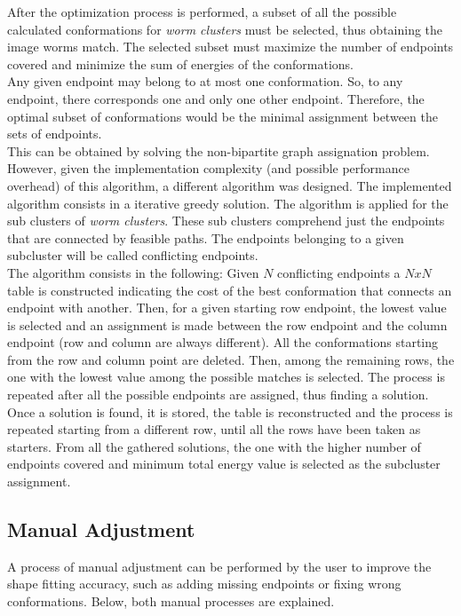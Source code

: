 After the optimization process is performed, a subset of all the possible calculated 
conformations for \emph{worm clusters} must be selected, thus obtaining the image
worms match. The selected subset must maximize the number of endpoints covered and 
minimize the sum of energies of the conformations.\\
Any given endpoint may belong to at most one conformation. So, to any endpoint,
 there corresponds one and only one other endpoint. Therefore, the optimal subset of
conformations would be the minimal assignment between the sets of endpoints.\\
This can be obtained by solving the non-bipartite graph assignation problem. However,
given the implementation complexity (and possible performance overhead) of this algorithm,
a different algorithm  was designed. The implemented algorithm consists in a iterative 
greedy solution. The algorithm is applied for the sub clusters of \emph{worm clusters}. 
These sub clusters comprehend just the endpoints that are connected 
by feasible paths. The endpoints belonging to a given subcluster will be called 
conflicting endpoints.\\

The algorithm consists in the following:
Given $N$ conflicting endpoints a $NxN$ table is constructed indicating the cost
of the best conformation that connects an endpoint with another. Then, for a given starting row endpoint, the lowest value is selected and an assignment is made
between the row endpoint and the column endpoint (row and column are always different).
All the conformations starting from the row and column point are deleted.
Then, among the remaining rows, the one with the lowest value among the possible matches
is selected. The process is repeated after all the possible endpoints are assigned, thus
finding a solution. Once a solution is found, it is stored, the table is reconstructed and
the process is repeated starting from a different row, until all the rows have been taken
as starters. From all the gathered solutions, the one with the higher number of endpoints
covered and minimum total energy value is selected as the subcluster assignment.

\subsection{Manual Adjustment}
\label{sec:manualproc}

A process of manual adjustment can be performed by the user to improve the shape fitting
accuracy, such as adding missing endpoints or fixing wrong conformations. 
Below, both manual processes are explained. 

